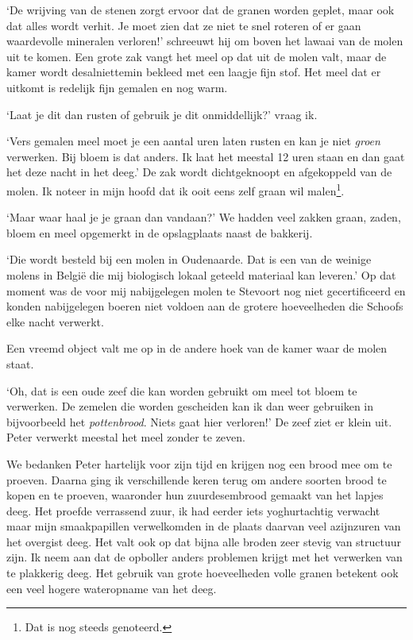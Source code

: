 \documentclass[
  11pt,
  dutch,
]{memoir}
\begin{document}
`De wrijving van de stenen zorgt ervoor dat de granen worden geplet,
maar ook dat alles wordt verhit. Je moet zien dat ze niet te snel
roteren of er gaan waardevolle mineralen verloren!' schreeuwt hij om
boven het lawaai van de molen uit te komen. Een grote zak vangt het meel
op dat uit de molen valt, maar de kamer wordt desalniettemin bekleed met
een laagje fijn stof. Het meel dat er uitkomt is redelijk fijn gemalen
en nog warm.

`Laat je dit dan rusten of gebruik je dit onmiddellijk?' vraag ik.

`Vers gemalen meel moet je een aantal uren laten rusten en kan je niet
\emph{groen} verwerken. Bij bloem is dat anders. Ik laat het meestal 12
uren staan en dan gaat het deze nacht in het deeg.' De zak wordt
dichtgeknoopt en afgekoppeld van de molen. Ik noteer in mijn hoofd dat
ik ooit eens zelf graan wil malen\footnote{Dat is nog steeds genoteerd.}.

`Maar waar haal je je graan dan vandaan?' We hadden veel zakken graan,
zaden, bloem en meel opgemerkt in de opslagplaats naast de bakkerij.

`Die wordt besteld bij een molen in Oudenaarde. Dat is een van de
weinige molens in België die mij biologisch lokaal geteeld materiaal kan
leveren.' Op dat moment was de voor mij nabijgelegen molen te Stevoort
nog niet gecertificeerd en konden nabijgelegen boeren niet voldoen aan
de grotere hoeveelheden die Schoofs elke nacht verwerkt.

Een vreemd object valt me op in de andere hoek van de kamer waar de
molen staat.

`Oh, dat is een oude zeef die kan worden gebruikt om meel tot bloem te
verwerken. De zemelen die worden gescheiden kan ik dan weer gebruiken in
bijvoorbeeld het \emph{pottenbrood}. Niets gaat hier verloren!' De zeef
ziet er klein uit. Peter verwerkt meestal het meel zonder te zeven.

We bedanken Peter hartelijk voor zijn tijd en krijgen nog een brood mee
om te proeven. Daarna ging ik verschillende keren terug om andere
soorten brood te kopen en te proeven, waaronder hun zuurdesembrood
gemaakt van het lapjes deeg. Het proefde verrassend zuur, ik had eerder
iets yoghurtachtig verwacht maar mijn smaakpapillen verwelkomden in de
plaats daarvan veel azijnzuren van het overgist deeg. Het valt ook op
dat bijna alle broden zeer stevig van structuur zijn. Ik neem aan dat de
opboller anders problemen krijgt met het verwerken van te plakkerig
deeg. Het gebruik van grote hoeveelheden volle granen betekent ook een
veel hogere wateropname van het deeg.
\end{document}
